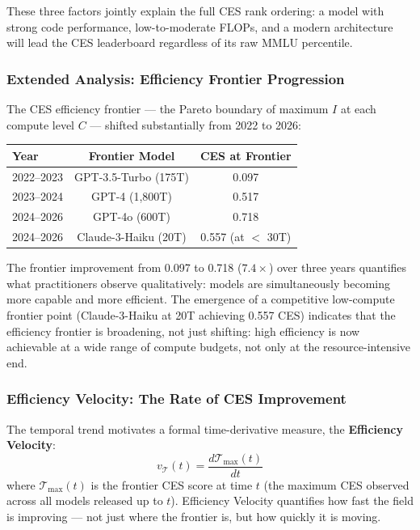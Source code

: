 \documentclass[12pt]{article}
\begin{document}
These three factors jointly explain the full CES rank ordering: a model with strong code performance, low-to-moderate FLOPs, and a modern architecture will lead the CES leaderboard regardless of its raw MMLU percentile.

\subsubsection{Extended Analysis: Efficiency Frontier Progression}

The CES efficiency frontier --- the Pareto boundary of maximum $I$ at each compute level $C$ --- shifted substantially from 2022 to 2026:

\begin{center}\small
\begin{tabular}{lcc}
\toprule
\textbf{Year} & \textbf{Frontier Model} & \textbf{CES at Frontier} \\
\midrule
2022--2023 & GPT-3.5-Turbo (175T) & 0.097 \\
2023--2024 & GPT-4 (1,800T) & 0.517 \\
2024--2026 & GPT-4o (600T) & 0.718 \\
2024--2026 & Claude-3-Haiku (20T) & 0.557 (at $<$ 30T) \\
\bottomrule
\end{tabular}
\end{center}

The frontier improvement from 0.097 to 0.718 ($7.4\times$) over three years quantifies what practitioners observe qualitatively: models are simultaneously becoming more capable and more efficient. The emergence of a competitive low-compute frontier point (Claude-3-Haiku at 20T achieving 0.557 CES) indicates that the efficiency frontier is broadening, not just shifting: high efficiency is now achievable at a wide range of compute budgets, not only at the resource-intensive end.

\subsubsection{Efficiency Velocity: The Rate of CES Improvement}
\label{sec:efficiency-velocity}

The temporal trend motivates a formal time-derivative measure, the \textbf{Efficiency Velocity}:
\begin{equation}
v_{\mathcal{T}}(t) = \frac{d\mathcal{T}_{\max}(t)}{dt}
\end{equation}
where $\mathcal{T}_{\max}(t)$ is the frontier CES score at time $t$ (the maximum CES observed across all models released up to $t$). Efficiency Velocity quantifies how fast the field is improving --- not just where the frontier is, but how quickly it is moving.
\end{document}

